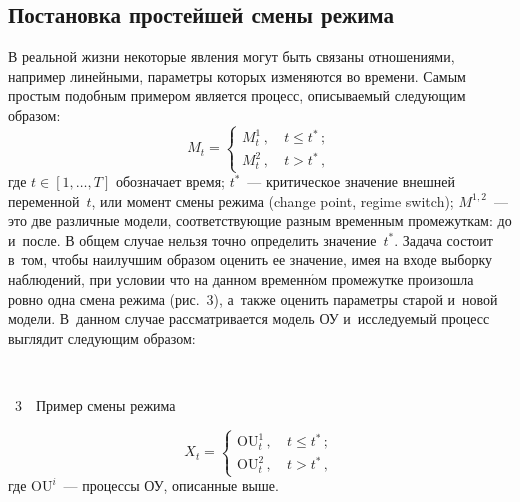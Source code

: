 \begin{multicols}{2}
\subsection{Постановка простейшей смены режима}

        В реальной жизни некоторые явления могут быть связаны отношениями, 
например линейными, параметры которых изменяются во времени. Самым простым 
подобным примером является процесс, описываемый следующим образом:      
 \begin{equation*}
        M_t= 
                        \begin{cases}
                M_t^1\,, &\ t \leqslant t^*\,; \\
                M_t^2\,, &\ t > t^*\,,
                \end{cases}
        \end{equation*}
        где $t \in [1,\ldots,T]$ обозначает время; $ t^*$~--- критическое 
значение внешней переменной~$t$, или момент смены режима (change point, regime 
switch);  $M^{1,2}$~--- это две различные модели, соответствующие разным 
временным промежуткам: до и~после.
        В общем случае нельзя точно определить значение~$t^*$. Задача состоит 
        в~том, чтобы наилучшим образом оценить ее значение, имея на входе выборку 
наблюдений, при условии что на данном временн$\acute{\mbox{о}}$м промежутке произошла ровно одна 
смена режима (рис.~3), а~также оценить параметры старой и~новой модели.   
В~данном случае 
рассматривается модель ОУ и~исследуемый процесс выглядит 
следующим образом:

\columnbreak

\noindent
 \begin{center}  %
 \vspace*{-2pt}
 \mbox{%
\epsfxsize=77.781mm
}

\vspace*{3pt}

\noindent
{{\figurename~3}\ \ \small{Пример смены режима}}
\end{center}



 \vspace*{6pt}



\addtocounter{figure}{1}


\noindent
\begin {equation*}
        X_t =                \begin{cases}
                \mathrm{OU}_t^1\,, &\ t \leqslant t^*\,; \\
                \mathrm{OU}_t^2\,, &\ t > t^*\,,
                \end{cases}
        \end {equation*}
        где $\mathrm{OU}^i$~--- процессы ОУ, описанные выше.


\end{multicols}
